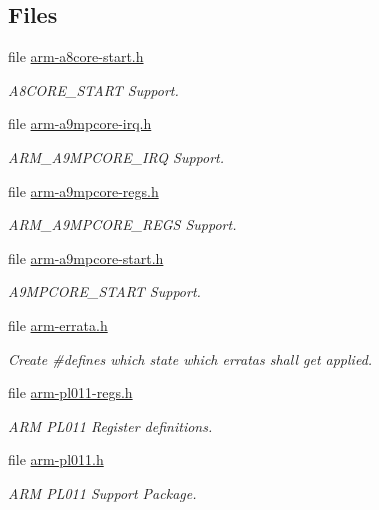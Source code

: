 \subsection*{Files}
\begin{DoxyCompactItemize}
\item 
file \mbox{\hyperlink{arm-a8core-start_8h}{arm-\/a8core-\/start.\+h}}
\begin{DoxyCompactList}\small\item\em A8\+C\+O\+R\+E\+\_\+\+S\+T\+A\+RT Support. \end{DoxyCompactList}\item 
file \mbox{\hyperlink{arm-a9mpcore-irq_8h}{arm-\/a9mpcore-\/irq.\+h}}
\begin{DoxyCompactList}\small\item\em A\+R\+M\+\_\+\+A9\+M\+P\+C\+O\+R\+E\+\_\+\+I\+RQ Support. \end{DoxyCompactList}\item 
file \mbox{\hyperlink{arm-a9mpcore-regs_8h}{arm-\/a9mpcore-\/regs.\+h}}
\begin{DoxyCompactList}\small\item\em A\+R\+M\+\_\+\+A9\+M\+P\+C\+O\+R\+E\+\_\+\+R\+E\+GS Support. \end{DoxyCompactList}\item 
file \mbox{\hyperlink{arm-a9mpcore-start_8h}{arm-\/a9mpcore-\/start.\+h}}
\begin{DoxyCompactList}\small\item\em A9\+M\+P\+C\+O\+R\+E\+\_\+\+S\+T\+A\+RT Support. \end{DoxyCompactList}\item 
file \mbox{\hyperlink{arm-errata_8h}{arm-\/errata.\+h}}
\begin{DoxyCompactList}\small\item\em Create \#defines which state which erratas shall get applied. \end{DoxyCompactList}\item 
file \mbox{\hyperlink{arm-pl011-regs_8h}{arm-\/pl011-\/regs.\+h}}
\begin{DoxyCompactList}\small\item\em A\+RM P\+L011 Register definitions. \end{DoxyCompactList}\item 
file \mbox{\hyperlink{arm-pl011_8h}{arm-\/pl011.\+h}}
\begin{DoxyCompactList}\small\item\em A\+RM P\+L011 Support Package. \end{DoxyCompactList}\item 

\end{DoxyCompactItemize}
